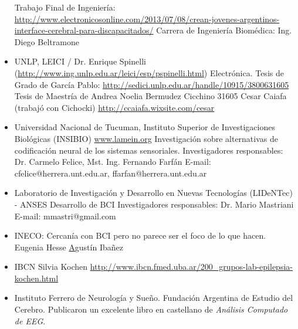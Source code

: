 \begin{itemize}
Trabajo Final de Ingeniería: \url{http://www.electronicosonline.com/2013/07/08/crean-jovenes-argentinos-interface-cerebral-para-discapacitados/}
Carrera de Ingeniería Biomédica: Ing. Diego Beltramone
\item UNLP, LEICI / Dr. Enrique Spinelli (\url{http://www.ing.unlp.edu.ar/leici/esp/pspinelli.html})
Electrónica.
Tesis de Grado de García Pablo: \url{http://sedici.unlp.edu.ar/handle/10915/3800631605}
Tesis de Maestría de Andrea Noelia Bermudez Cicchino 31605
Cesar Caiafa (trabajó con Cichocki) \url{http://ccaiafa.wixsite.com/cesar}
\item Universidad Nacional de Tucuman, Instituto Superior de Investigaciones Biológicas (INSIBIO)
\url{www.lamein.org}
Investigación sobre alternativas de codificación neural de los sistemas sensoriales.
Investigadores responsables: Dr. Carmelo Felice, Mst. Ing. Fernando Farfán
E-mail: cfelice@herrera.unt.edu.ar, ffarfan@herrera.unt.edu.ar
\item Laboratorio de Investigación y Desarrollo en Nuevas Tecnologías (LIDeNTec) - ANSES
Desarrollo de BCI
Investigadores responsables: Dr. Mario Mastriani
E-mail: mmastri@gmail.com
\item INECO: Cercanía con BCI pero no parece ser el foco de lo que hacen.
Eugenia Hesse \href{https://neuro.org.ar/sites/neuro.org.ar/files/Hesse-2015-Early%20detection%20of%20intentional%20harm.pdf}
Agustín Ibañez
\item  IBCN Silvia Kochen
\url{http://www.ibcn.fmed.uba.ar/200_grupos-lab-epilepsia-kochen.html}
\item Instituto Ferrero de Neurología y Sueño. Fundación Argentina de Estudio del Cerebro.
Publicaron un excelente libro en castellano de \textit{Análisis Computado de EEG}.

\end{itemize}